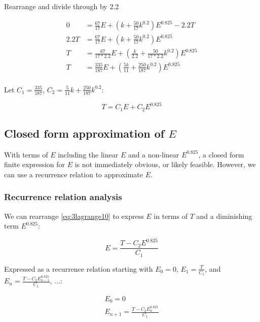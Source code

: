 \documentclass{article}
\begin{document}
Rearrange and divide through by 2.2

\begin{equation}\label{eq:3lagrange9}
  \begin{split}
    0 & = \frac{67}{17}E + (k + \frac{50}{17}k^{0.2})E^{0.825} - 2.2 T \\
    2.2 T & = \frac{67}{17}E + (k + \frac{50}{17}k^{0.2})E^{0.825} \\
    T & = \frac{67}{17 * 2.2}E + (\frac{k}{2.2} + \frac{50}{17 * 2.2}k^{0.2})E^{0.825} \\
    T & = \frac{335}{187}E + (\frac{5k}{11} + \frac{250}{187}k^{0.2})E^{0.825} \\
  \end{split}
\end{equation}

Let $C_1 = \frac{335}{187}$, $C_2 = \frac{5}{11}k + \frac{250}{187}k^{0.2}$:

\begin{equation}\label{eq:3lagrange10}
  T = C_1E + C_2E^{0.825}
\end{equation}

\subsection{Closed form approximation of $E$}

With terms of $E$ including the linear $E$ and a non-linear $E^{0.825}$, a closed form finite expression for $E$ is not immediately obvious, or likely feasible. However, we can use a recurrence relation to approximate $E$.

\subsubsection{Recurrence relation analysis}

We can rearrange \eqref{eq:3lagrange10} to express $E$ in terms of $T$ and a diminishing term $E^{0.825}$:

\begin{equation}
  E = \frac{T - C_2E^{0.825}}{C_1}
\end{equation}

Expressed as a recurrence relation starting with $E_0 = 0$, $E_1 = \frac{T}{C_1}$, and $E_n = \frac{T - C_2E_{n-1}^{0.825}}{C_1}$, ...:

\begin{gather}
  E_0 = 0 \\
  E_{n+1} = \frac{T - C_2E_n^{0.825}}{C_1}
\end{gather}
\end{document}
